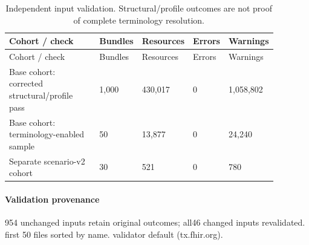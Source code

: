{\small\setlength{\tabcolsep}{3pt}
\begin{longtable}{p{0.38\linewidth}p{0.12\linewidth}p{0.14\linewidth}p{0.1\linewidth}p{0.14\linewidth}}
\caption{Independent input validation. Structural/profile outcomes are not proof of complete terminology resolution.}\label{sup:inputvalidation}\\
\hline
Cohort / check & Bundles & Resources & Errors & Warnings \\ \hline
\endfirsthead
\hline
Cohort / check & Bundles & Resources & Errors & Warnings \\ \hline
\endhead
Base cohort:\allowbreak{} corrected structural/\allowbreak{}profile pass & 1,000 & 430,017 & 0 & 1,058,802 \\
Base cohort:\allowbreak{} terminology-\allowbreak{}enabled sample & 50 & 13,877 & 0 & 24,240 \\
Separate scenario-\allowbreak{}v2 cohort & 30 & 521 & 0 & 780 \\
\hline\end{longtable}}

\paragraph{Validation provenance}
954 unchanged inputs retain original outcomes; all46 changed inputs revalidated. first 50 files sorted by name. validator default (tx.fhir.org).

